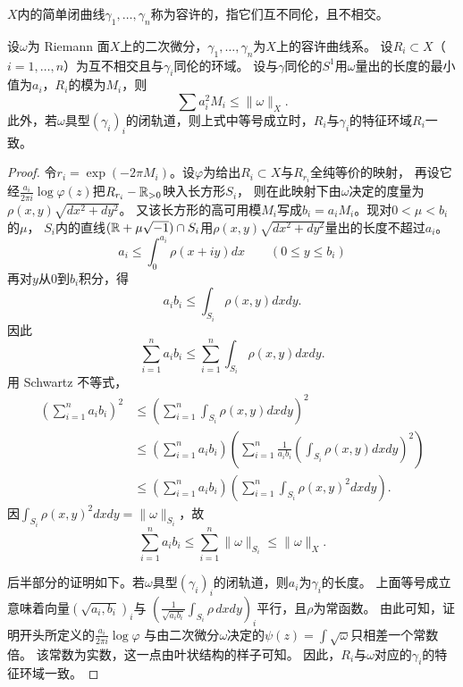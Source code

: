 
\begin{definition}[容许曲线系]
$X$内的简单闭曲线$\gamma_1,\dots,\gamma_n$称为容许的，指它们互不同伦，且不相交。
\end{definition}

\begin{lemma}
设$\omega$为 Riemann 面$X$上的二次微分，$\gamma_1,\dots,\gamma_n$为$X$上的容许曲线系。
设$R_i\subset X$（$i=1,\dots,n$）为互不相交且与$\gamma_i$同伦的环域。
设与$\gamma$同伦的$S^1$用$\omega$量出的长度的最小值为$a_i$，$R_i$的模为$M_i$，则
\[
\sum a_i^2M_i\le\|\omega\|_X.
\]
此外，若$\omega$具型$(\gamma_i)_i$的闭轨道，则上式中等号成立时，$R_i$与$\gamma_i$的特征环域$R_i$一致。
\end{lemma}


\begin{proof}
令$r_i=\exp(-2\pi M_i)$。设$\varphi$为给出$R_i\subset X$与$R_{r_i}$全纯等价的映射，
再设它经$\frac{a_i}{2\pi i}\log\varphi(z)$把$R_{r_i}-\mathbb{R}_{>0}$映入长方形$S_i$，
则在此映射下由$\omega$决定的度量为$\rho(x,y)\sqrt{dx^2+dy^2}$。
又该长方形的高可用模$M_i$写成$b_i=a_iM_i$。现对$0<\mu<b_i$的$\mu$，
$S_i$内的直线$(\mathbb{R}+\mu\sqrt{-1})\cap S_i$用$\rho(x,y)\sqrt{dx^2+dy^2}$量出的长度不超过$a_i$。
\[
a_i\le\int_0^{a_i}\rho(x+iy)dx\qquad(0\le y\le b_i)
\]
再对$y$从$0$到$b_i$积分，得
\[
a_ib_i\le\int_{S_i}\rho(x,y)dxdy.
\]
因此
\[
\sum_{i=1}^n a_ib_i\le\sum_{i=1}^n\int_{S_i}\rho(x,y)dxdy.
\]
用 Schwartz 不等式，
\begin{align*}
\left(\sum_{i=1}^n a_ib_i\right)^2
&\le\left(\sum_{i=1}^n\int_{S_i}\rho(x,y)dxdy\right)^2\\
&\le\left(\sum_{i=1}^n a_ib_i\right)
  \left(\sum_{i=1}^n\frac{1}{a_ib_i}\left(\int_{S_i}\rho(x,y)dxdy\right)^2\right)\\
&\le\left(\sum_{i=1}^n a_ib_i\right)
  \left(\sum_{i=1}^n\int_{S_i}\rho(x,y)^2dxdy\right).
\end{align*}
因$\int_{S_i}\rho(x,y)^2dxdy=\|\omega\|_{S_i}$，故
\[
\sum_{i=1}^n a_ib_i\le\sum_{i=1}^n\|\omega\|_{S_i}\le\|\omega\|_X.
\]

后半部分的证明如下。若$\omega$具型$(\gamma_i)_i$的闭轨道，则$a_i$为$\gamma_i$的长度。
上面等号成立意味着向量$(\sqrt{a_i,b_i})_i$与
$\left(\frac{1}{\sqrt{a_ib_i}}\int_{S_i}\rho\,dxdy\right)_i$平行，且$\rho$为常函数。
由此可知，证明开头所定义的$\frac{a_i}{2\pi i}\log\varphi$
与由二次微分$\omega$决定的$\psi(z)=\int\sqrt{\omega}$只相差一个常数倍。
该常数为实数，这一点由叶状结构的样子可知。
因此，$R_i$与$\omega$对应的$\gamma_i$的特征环域一致。
\end{proof}

